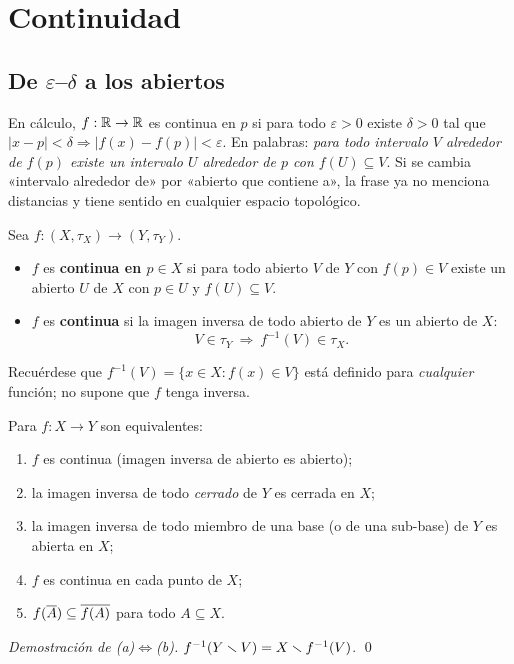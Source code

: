 \section{Continuidad}\label{sec:cont}
\subsection{De $\varepsilon$--$\delta$ a los abiertos}
En cálculo, $f:\mathbb{R}\to\mathbb{R}$ es continua en $p$ si para todo $\varepsilon>0$ existe $\delta>0$ tal que
$|x-p|<\delta\Rightarrow|f(x)-f(p)|<\varepsilon$. En palabras: \emph{para todo intervalo $V$ alrededor de $f(p)$ existe
un intervalo $U$ alrededor de $p$ con $f(U)\subseteq V$}. Si se cambia «intervalo alrededor de» por «abierto que
contiene a», la frase ya no menciona distancias y tiene sentido en cualquier espacio topológico.

\begin{definicion}
Sea $f:(X,\tau_X)\to(Y,\tau_Y)$.
\begin{itemize}
\item $f$ es \textbf{continua en $p\in X$} si para todo abierto $V$ de $Y$ con $f(p)\in V$ existe un abierto $U$ de $X$
con $p\in U$ y $f(U)\subseteq V$.
\item $f$ es \textbf{continua} si la imagen inversa de todo abierto de $Y$ es un abierto de $X$:
\[V\in\tau_Y\ \Longrightarrow\ f^{-1}(V)\in\tau_X .\]
\end{itemize}
\end{definicion}
Recuérdese que $f^{-1}(V)=\{x\in X: f(x)\in V\}$ está definido para \emph{cualquier} función; no supone que $f$ tenga
inversa.

\begin{teorema}
Para $f:X\to Y$ son equivalentes:
\begin{enumerate}[label=(\alph*),leftmargin=1.9em]
\item $f$ es continua (imagen inversa de abierto es abierto);
\item la imagen inversa de todo \emph{cerrado} de $Y$ es cerrada en $X$;
\item la imagen inversa de todo miembro de una base (o de una sub-base) de $Y$ es abierta en $X$;
\item $f$ es continua en cada punto de $X$;
\item $f(\overline{A})\subseteq\overline{f(A)}$ para todo $A\subseteq X$.
\end{enumerate}
\end{teorema}
\emph{Demostración de (a)$\iff$(b).} $f^{-1}(Y\smallsetminus V)=X\smallsetminus f^{-1}(V)$. \qed

